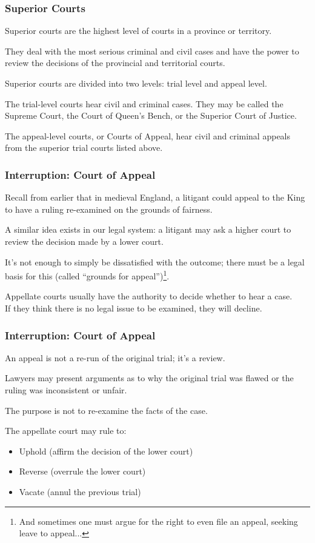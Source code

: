 \begin{frame}
\frametitle{Superior Courts}

Superior courts are the highest level of courts in a province or territory. 

They deal with the most serious criminal and civil cases and have the power to review the decisions of the provincial and territorial courts.

Superior courts are divided into two levels: trial level and appeal level.

The trial-level courts hear civil and criminal cases. They may be called the Supreme Court, the Court of Queen's Bench, or the Superior Court of Justice.

The appeal-level courts, or Courts of Appeal, hear civil and criminal appeals from the superior trial courts listed above.

\end{frame}




\begin{frame}
\frametitle{Interruption: Court of Appeal}

Recall from earlier that in medieval England, a litigant could appeal to the King to have a ruling re-examined on the grounds of fairness. 

A similar idea exists in our legal system: a litigant may ask a higher court to review the decision made by a lower court.

It's not enough to simply be dissatisfied with the outcome; there must be a legal basis for this (called ``grounds for appeal'')\footnote{And sometimes one must argue for the right to even file an appeal, seeking leave to appeal...}.

Appellate courts usually have the authority to decide whether to hear a case.\\
\quad If they think there is no legal issue to be examined, they will decline.

\end{frame}



\begin{frame}
\frametitle{Interruption: Court of Appeal}

An appeal is not a re-run of the original trial; it's a review.

Lawyers may present arguments as to why the original trial was flawed or the ruling was inconsistent or unfair.

The purpose is not to re-examine the facts of the case.

The appellate court may rule to:

\begin{itemize}
	\item Uphold (affirm the decision of the lower court)
	\item Reverse (overrule the lower court)
	\item Vacate (annul the previous trial)
\end{itemize}

\end{frame}



